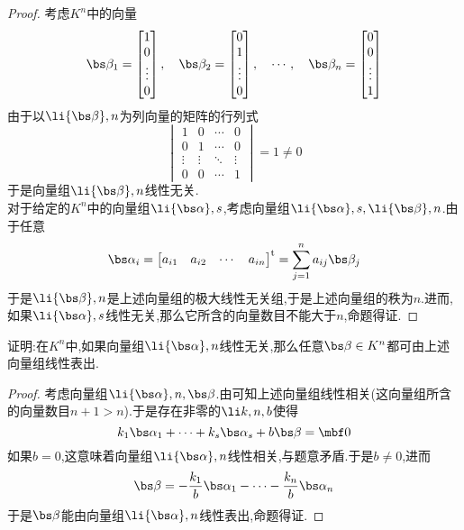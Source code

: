 \documentclass{ctexart}
\begin{document}
\begin{proof}
    考虑$K^n$中的向量
    \[\bs\beta_1=\begin{bmatrix}
        1\\0\\\vdots\\0
    \end{bmatrix},\quad\bs\beta_2=\begin{bmatrix}
        0\\1\\\vdots\\0
    \end{bmatrix},\quad\cdots,\quad\bs\beta_n=\begin{bmatrix}
        0\\0\\\vdots\\1
    \end{bmatrix}\]
    由于以$\li{\bs\beta},n$为列向量的矩阵的行列式
    \[\begin{vmatrix}
        1&0&\cdots&0\\
        0&1&\cdots&0\\
        \vdots&\vdots&\ddots&\vdots\\
        0&0&\cdots&1
    \end{vmatrix}=1\neq0\]
    于是向量组$\li{\bs\beta},n$线性无关.\\
    对于给定的$K^n$中的向量组$\li{\bs\alpha},s$,考虑向量组$\li{\bs\alpha},s,\li{\bs\beta},n$.由于任意
    \[\bs\alpha_i=\begin{bmatrix}
        a_{i1}&a_{i2}&\cdots&a_{in}
    \end{bmatrix}^{\text{t}}=\sum_{j=1}^{n}a_{ij}\bs\beta_j\]
    于是$\li{\bs\beta},n$是上述向量组的极大线性无关组,于是上述向量组的秩为$n$.进而,如果$\li{\bs\alpha},s$线性无关,那么它所含的向量数目不能大于$n$,命题得证.
\end{proof}
\begin{homework}[5]
    证明:在$K^n$中,如果向量组$\li{\bs\alpha},n$线性无关,那么任意$\bs\beta\in K^n$都可由上述向量组线性表出.
\end{homework}
\begin{proof}
    考虑向量组$\li{\bs\alpha},n,\bs\beta$.由可知上述向量组线性相关(这向量组所含的向量数目$n+1>n$).于是存在非零的$\li k,n,b$使得
    \[k_1\bs\alpha_1+\cdots+k_s\bs\alpha_s+b\bs\beta=\mbf0\]
    如果$b=0$,这意味着向量组$\li{\bs\alpha},n$线性相关,与题意矛盾.于是$b\neq0$,进而
    \[\bs\beta=-\dfrac{k_1}{b}\bs\alpha_1-\cdots-\dfrac{k_n}{b}\bs\alpha_n\]
    于是$\bs\beta$能由向量组$\li{\bs\alpha},n$线性表出,命题得证.
\end{proof}
\end{document}
